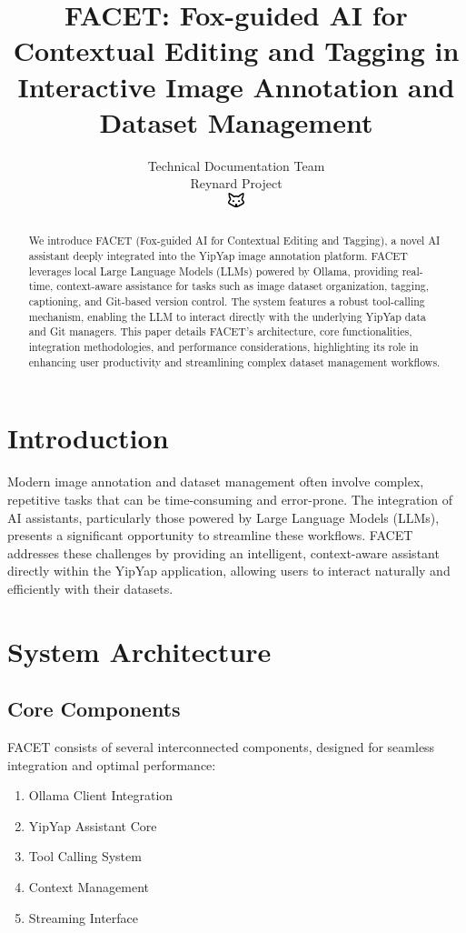 \documentclass[10pt]{article}
\begin{document}
\title{FACET: Fox-guided AI for Contextual Editing and Tagging in Interactive Image Annotation and Dataset Management}

\author{Technical Documentation Team\\
Reynard Project\\
\includegraphics[width=0.5cm]{favicon.pdf}}

\maketitle

\begin{abstract}
We introduce FACET (Fox-guided AI for Contextual Editing and Tagging), a novel AI assistant deeply integrated into the YipYap image annotation platform. FACET leverages local Large Language Models (LLMs) powered by Ollama, providing real-time, context-aware assistance for tasks such as image dataset organization, tagging, captioning, and Git-based version control. The system features a robust tool-calling mechanism, enabling the LLM to interact directly with the underlying YipYap data and Git managers. This paper details FACET's architecture, core functionalities, integration methodologies, and performance considerations, highlighting its role in enhancing user productivity and streamlining complex dataset management workflows.
\end{abstract}

\section{Introduction}
Modern image annotation and dataset management often involve complex, repetitive tasks that can be time-consuming and error-prone. The integration of AI assistants, particularly those powered by Large Language Models (LLMs), presents a significant opportunity to streamline these workflows. FACET addresses these challenges by providing an intelligent, context-aware assistant directly within the YipYap application, allowing users to interact naturally and efficiently with their datasets.

\section{System Architecture}
\subsection{Core Components}
FACET consists of several interconnected components, designed for seamless integration and optimal performance:
\begin{enumerate}
    \item Ollama Client Integration
    \item YipYap Assistant Core
    \item Tool Calling System
    \item Context Management
    \item Streaming Interface
\end{enumerate}
\end{document}
